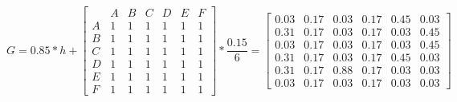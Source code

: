 \[G = 0.85*h + \left[ {\begin{array}{*{20}{c}}
{}&A&B&C&D&E&F\\
A&1&1&1&1&1&1\\
B&1&1&1&1&1&1\\
C&1&1&1&1&1&1\\
D&1&1&1&1&1&1\\
E&1&1&1&1&1&1\\
F&1&1&1&1&1&1
\end{array}} \right]*\frac{{0.15}}{6} = \left[ {\begin{array}{*{20}{c}}
{0.03}&{0.17}&{0.03}&{0.17}&{0.45}&{0.03}\\
{0.31}&{0.17}&{0.03}&{0.17}&{0.03}&{0.45}\\
{0.03}&{0.17}&{0.03}&{0.17}&{0.03}&{0.45}\\
{0.31}&{0.17}&{0.03}&{0.17}&{0.45}&{0.03}\\
{0.31}&{0.17}&{0.88}&{0.17}&{0.03}&{0.03}\\
{0.03}&{0.17}&{0.03}&{0.17}&{0.03}&{0.03}
\end{array}} \right]\]

